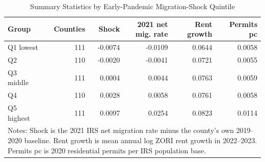 \begin{table}[!htbp]\centering
\caption{Summary Statistics by Early-Pandemic Migration-Shock Quintile}\label{tab:shock_group_summary}
\begin{tabular}{lrrrrr}\toprule
Group & Counties & Shock & 2021 net mig. rate & Rent growth & Permits pc \\
\midrule
Q1 lowest & 111 & -0.0074 & -0.0109 & 0.0644 & 0.0058 \\
Q2 & 110 & -0.0020 & -0.0041 & 0.0721 & 0.0055 \\
Q3 middle & 111 & 0.0004 & 0.0044 & 0.0763 & 0.0059 \\
Q4 & 110 & 0.0028 & 0.0058 & 0.0761 & 0.0058 \\
Q5 highest & 111 & 0.0097 & 0.0254 & 0.0823 & 0.0114 \\
\bottomrule
\multicolumn{6}{p{0.88\textwidth}}{\footnotesize Notes: Shock is the 2021 IRS net migration rate minus the county's own 2019--2020 baseline. Rent growth is mean annual log ZORI rent growth in 2022--2023. Permits pc is 2020 residential permits per IRS population base.}
\end{tabular}
\end{table}
